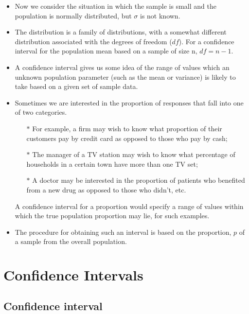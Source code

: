 \documentclass[]{report}
\begin{document}
\begin{itemize}
\item Now we consider the situation in which the sample is small and the population is normally distributed,
but $\sigma$ is not known.
\item The distribution is a family of distributions, with
a somewhat different distribution associated with the degrees of freedom ($df$). For a confidence interval for the
population mean based on a sample of size n, $df = n - 1$.
\end{itemize}
\begin{itemize}
\item A confidence interval gives us some idea of the range of values which an unknown population parameter (such as the mean or variance) is likely to take based on a given set of sample data.

\item Sometimes we are interested in the proportion of responses that fall into one of two categories.
\begin{itemize} \item[$\ast$] For example, a firm may wish to know what proportion of their customers pay by credit card as opposed to those who pay by cash;
\item[$\ast$]  The manager of a TV station may wish to know what percentage of households in a certain town have more than one TV set; 
\item[$\ast$]  A doctor may be interested in the proportion of patients who benefited from a new drug as opposed to those who didn't, etc.
\end{itemize}
A confidence interval for a proportion would specify a range of values within which the true population proportion may lie, for such examples.
\item The procedure for obtaining such an interval is based on the proportion, $p$ of a sample from the overall population.

\end{itemize}

\section{Confidence Intervals}
\subsection{Confidence interval}
\end{document}
